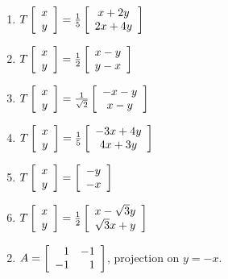\begin{multicols}{2}
\begin{ex}
\begin{enumerate}[label={\alph*.}]
\item $T\left[
\begin{array}{c}
x\\
y 
\end{array}
\right]
= \tfrac{1}{5}
\left[
\begin{array}{c}
x + 2y\\
2x + 4y 
\end{array}
\right]$
\item $T\left[
\begin{array}{c}
x\\
y 
\end{array}
\right]
= \tfrac{1}{2}
\left[
\begin{array}{c}
x - y\\
y - x
\end{array}
\right]$
\item $T\left[
\begin{array}{c}
x\\
y 
\end{array}
\right]
= \tfrac{1}{\sqrt{2}}
\left[
\begin{array}{c}
-x - y\\
x - y 
\end{array}
\right]$
\item $T\left[
\begin{array}{c}
x\\
y 
\end{array}
\right]
= \tfrac{1}{5}
\left[
\begin{array}{c}
-3x + 4y\\
4x + 3y 
\end{array}
\right]$
\item $T\left[
\begin{array}{c}
x\\
y 
\end{array}
\right] =
\left[
\begin{array}{c}
-y\\
-x 
\end{array}
\right]$
\item $T\left[
\begin{array}{c}
x\\
y 
\end{array}
\right]
= \tfrac{1}{2}
\left[
\begin{array}{c}
x - \sqrt{3}y\\
\sqrt{3}x + y 
\end{array}
\right]$
\end{enumerate}
\begin{sol}
\begin{enumerate}[label={\alph*.}]
\setcounter{enumi}{1}
\item  $A = \left[
\begin{array}{rr}
1 & -1\\
-1 & 1\\
\end{array}
\right]$, projection on $y = -x$.


\end{enumerate}
\end{sol}
\end{ex}
\end{multicols}
